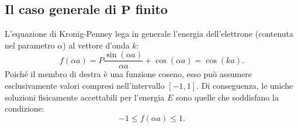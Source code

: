 \documentclass[a4paper,11pt]{report}
\begin{document}
    \subsection{Il caso generale di $\bm{P}$ finito}
L'equazione di Kronig-Penney lega in generale l'energia dell'elettrone (contenuta nel parametro $\alpha$) al vettore d'onda $k$:
\begin{equation}
    f(\alpha a) = P \frac{\sin(\alpha a)}{\alpha a} + \cos(\alpha a) = \cos(ka).
    \label{eq:KP_transcendental}
\end{equation}
Poiché il membro di destra è una funzione coseno, esso può assumere esclusivamente valori compresi nell'intervallo $[-1, 1]$. Di conseguenza, le uniche soluzioni fisicamente accettabili per l'energia $E$ sono quelle che soddisfano la condizione:
\begin{equation}
    -1 \leq f(\alpha a) \leq 1.
\end{equation}
\end{document}
